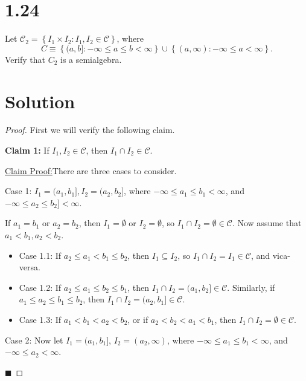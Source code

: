 \documentclass[12pt]{article}
\newenvironment{claimproof}[1]{\par\noindent\underline{Claim Proof:}\space#1}{\hfill $\blacksquare$}
\begin{document}
\newpage
\section*{1.24}

Let $\mathcal{C}_{2} = \left\{ I_{1} \times I_{2} : I_{1}, I_{2} \in \mathcal{C} \right\}$, where 
\[ C \equiv \left\{ (a,b] : -\infty \leq a \leq b < \infty \right\} \cup \left\{ (a,\infty) : -\infty  \leq a < \infty \right\}. \]
Verify that $C_{2}$ is a semialgebra.

\section*{Solution}

\begin{proof}
First we will verify the following claim.

{\bf Claim 1:} If $I_{1}, I_{2} \in \mathcal{C}$, then $I_{1}\cap I_{2} \in \mathcal{C}$.

\begin{claimproof}
There are three cases to consider.

Case 1: $I_{1} = (a_{1}, b_{1}], I_{2} = (a_{2}, b_{2}]$, where $-\infty \leq a_{1}\leq b_{1} < \infty$, and $-\infty \leq a_{2} \leq b_{2}] <
\infty$.

If $a_{1} = b_{1}$ or $a_{2} = b_{2}$, then $I_{1} = \emptyset$ or $I_{2} = \emptyset$, so $I_{1}\cap I_{2} = \emptyset \in \mathcal{C}$. Now assume
that $a_{1} < b_{1}, a_{2} < b_{2}$.
\begin{itemize}[label={},leftmargin=4mm, itemsep=1em, parsep=1em]
\item Case 1.1: If $a_{2} \leq a_{1} < b_{1} \leq b_{2}$, then $I_{1} \subseteq I_{2}$, so $I_{1} \cap I_{2} = I_{1} \in \mathcal{C}$, and vica-versa.

\item Case 1.2: If $a_{2} \leq a_{1} \leq b_{2} \leq b_{1}$, then $I_{1} \cap I_{2} = (a_{1}, b_{2}] \in \mathcal{C}$. Similarly, if $a_{1} \leq a_{2}
\leq b_{1} \leq b_{2}$, then $I_{1}\cap I_{2} = (a_{2},b_{1}] \in \mathcal{C}$.

\item Case 1.3: If $a_{1} < b_{1} < a_{2} < b_{2}$, or if $a_{2} < b_{2} < a_{1} < b_{1}$, then $I_{1} \cap I_{2} = \emptyset \in \mathcal{C}$. 
\end{itemize}

Case 2: Now let $I_{1} = (a_{1}, b_{1}]$, $I_{2} = (a_{2}, \infty)$, where $-\infty \leq a_{1} \leq b_{1} < \infty$, and $-\infty \leq a_{2} <
\infty$.


\end{claimproof}
\end{proof}
\end{document}
